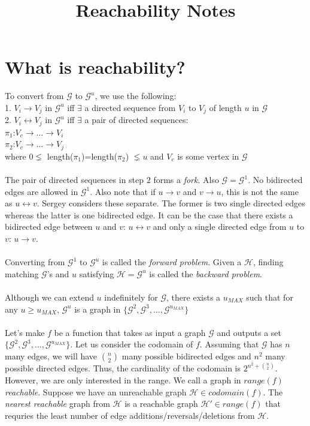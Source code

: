 \documentclass{article}
\theoremstyle{definition}
\begin{document}
\title{Reachability Notes}
\maketitle

\section{What is reachability?}

To convert from $\mathcal{G}$ to $\mathcal{G}^u$, we use the following:
\\
1. $V_i \rightarrow V_j$ in $\mathcal{G}^u$ iff $\exists$ a directed sequence from $V_i$ to $V_j$ of length $u$ in $\mathcal{G}$
\\
2. $V_i \leftrightarrow V_j$ in $\mathcal{G}^u$ iff $\exists$ a pair of directed sequences:
\\
$ \pi_1$:$ V_c \rightarrow ... \rightarrow V_i$
\\
$ \pi_2$:$ V_c \rightarrow ... \rightarrow V_j$
\\
where $0 \lneq$ length($\pi_1$)=length($\pi_2$) $\lneq u$ and $V_c$ is some vertex in $\mathcal{G}$ 
\\
\\
The pair of directed sequences in step $2$ forms a \textit{fork}. Also $\mathcal{G}= \mathcal{G}^1$. No bidirected edges are allowed in $\mathcal{G}^1$. Also note that if $u \rightarrow v$ and $v \rightarrow u$, this is not the same as $u \leftrightarrow v$. Sergey considers these separate. The former is two single directed edges whereas the latter is one bidirected edge. It can be the case that there exists a bidirected edge between $u$ and $v$: $u \leftrightarrow v$ and only a single directed edge from $u$ to $v$: $u \rightarrow v$.
\\
\\
Converting from $\mathcal{G}^1$ to $\mathcal{G}^u$ is called the \textit{forward problem}. Given a $\mathcal{H}$, finding matching $\mathcal{G}$'s and $u$ satisfying $\mathcal{H} = \mathcal{G}^u$ is called the \textit{backward problem}. 
\\
\\
Although we can extend $u$ indefinitely for $\mathcal{G}$, there exists a $u_{MAX}$ such that for any $u \geq u_{MAX}$, $\mathcal{G}^{u}$ is a graph in $\{\mathcal{G}^2,\mathcal{G}^3,...,\mathcal{G}^{u_{MAX}}\}$
\\
\\
Let's make $f$ be a function that takes as input a graph $\mathcal{G}$ and outputs a set $\{\mathcal{G}^2,\mathcal{G}^3,...,\mathcal{G}^{u_{MAX}}\}$. Let us consider the codomain of $f$. Assuming that $\mathcal{G}$ has $n$ many edges, we will have ${n \choose 2}$ many possible bidirected edges and $n^2$ many possible directed edges. Thus, the cardinality of the codomain is $2^{n^2+{n \choose 2}}$. However, we are only interested in the range. We call a graph in $range(f)$ \textit{reachable}. Suppose we have an unreachable graph $\mathcal{H} \in codomain(f)$. The \textit{nearest reachable} graph from $\mathcal{H}$ is a reachable graph $\mathcal{H'} \in range(f)$ that requries the least number of edge additions/reversals/deletions from $\mathcal{H}$.
\end{document}
